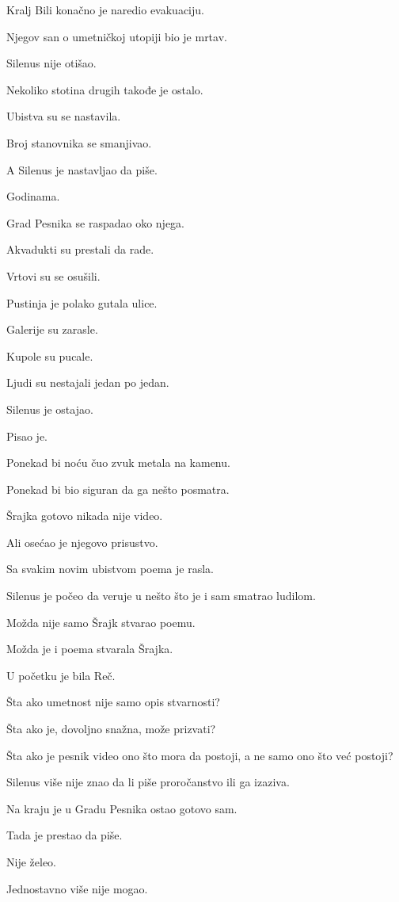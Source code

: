 Kralj Bili konačno je naredio evakuaciju.

Njegov san o umetničkoj utopiji bio je mrtav.

Silenus nije otišao.

Nekoliko stotina drugih takođe je ostalo.

Ubistva su se nastavila.

Broj stanovnika se smanjivao.

A Silenus je nastavljao da piše.

Godinama.

\bigskip

Grad Pesnika se raspadao oko njega.

Akvadukti su prestali da rade.

Vrtovi su se osušili.

Pustinja je polako gutala ulice.

Galerije su zarasle.

Kupole su pucale.

Ljudi su nestajali jedan po jedan.

Silenus je ostajao.

Pisao je.

Ponekad bi noću čuo zvuk metala na kamenu.

Ponekad bi bio siguran da ga nešto posmatra.

Šrajka gotovo nikada nije video.

Ali osećao je njegovo prisustvo.

Sa svakim novim ubistvom poema je rasla.

Silenus je počeo da veruje u nešto što je i sam smatrao ludilom.

Možda nije samo Šrajk stvarao poemu.

Možda je i poema stvarala Šrajka.

U početku je bila Reč.

Šta ako umetnost nije samo opis stvarnosti?

Šta ako je, dovoljno snažna, može prizvati?

Šta ako je pesnik video ono što mora da postoji, a ne samo ono što već postoji?

Silenus više nije znao da li piše proročanstvo ili ga izaziva.

Na kraju je u Gradu Pesnika ostao gotovo sam.

Tada je prestao da piše.

Nije želeo.

Jednostavno više nije mogao.

